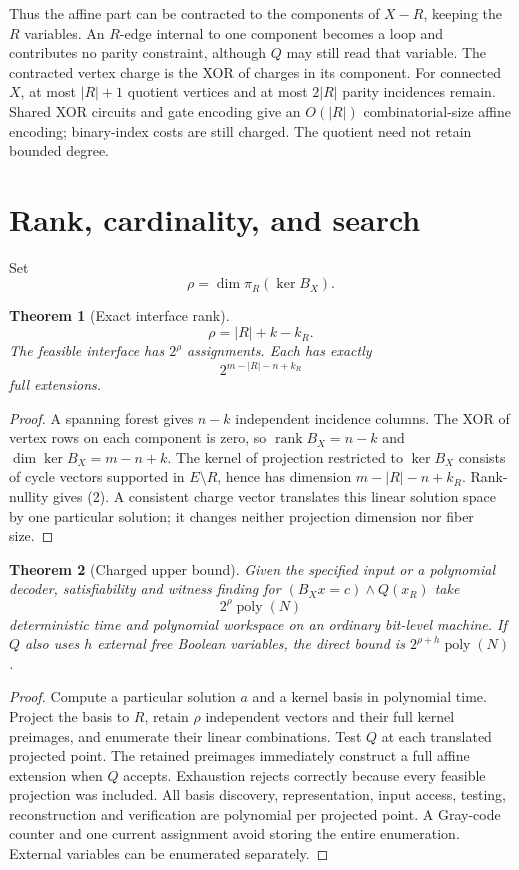 \documentclass[11pt]{article}
\newtheorem{theorem}{Theorem}
\begin{document}
Thus the affine part can be contracted to the components of $X-R$, keeping the $R$ variables. An $R$-edge internal to one component becomes a loop and contributes no parity constraint, although $Q$ may still read that variable. The contracted vertex charge is the XOR of charges in its component. For connected $X$, at most $|R|+1$ quotient vertices and at most $2|R|$ parity incidences remain. Shared XOR circuits and gate encoding give an $O(|R|)$ combinatorial-size affine encoding; binary-index costs are still charged. The quotient need not retain bounded degree.
\section{Rank, cardinality, and search}
Set
\[
\rho=\dim\pi_R(\ker B_X).
\]
\begin{theorem}[Exact interface rank]
\[
\boxed{\rho=|R|+k-k_R.} \tag{2}
\]
The feasible interface has $2^\rho$ assignments. Each has exactly
\[
2^{m-|R|-n+k_R}
\]
full extensions.
\end{theorem}
\begin{proof}
A spanning forest gives $n-k$ independent incidence columns. The XOR of vertex rows on each component is zero, so $\operatorname{rank}B_X=n-k$ and $\dim\ker B_X=m-n+k$. The kernel of projection restricted to $\ker B_X$ consists of cycle vectors supported in $E\setminus R$, hence has dimension $m-|R|-n+k_R$. Rank-nullity gives (2). A consistent charge vector translates this linear solution space by one particular solution; it changes neither projection dimension nor fiber size.
\end{proof}

\begin{theorem}[Charged upper bound]
Given the specified input or a polynomial decoder, satisfiability and witness finding for $(B_Xx=c)\land Q(x_R)$ take
\[
2^\rho\operatorname{poly}(N)
\]
deterministic time and polynomial workspace on an ordinary bit-level machine. If $Q$ also uses $h$ external free Boolean variables, the direct bound is $2^{\rho+h}\operatorname{poly}(N)$.
\end{theorem}
\begin{proof}
Compute a particular solution $a$ and a kernel basis in polynomial time. Project the basis to $R$, retain $\rho$ independent vectors and their full kernel preimages, and enumerate their linear combinations. Test $Q$ at each translated projected point. The retained preimages immediately construct a full affine extension when $Q$ accepts. Exhaustion rejects correctly because every feasible projection was included. All basis discovery, representation, input access, testing, reconstruction and verification are polynomial per projected point. A Gray-code counter and one current assignment avoid storing the entire enumeration. External variables can be enumerated separately.
\end{proof}
\end{document}
